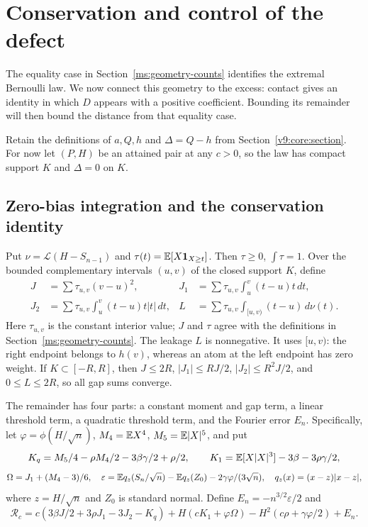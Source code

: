 \section{Conservation and control of the defect}\label{revision:conservation}
The equality case in Section~\ref{ms:geometry-counts} identifies the
extremal Bernoulli law. We now connect this geometry to the excess:
contact gives an identity in which $D$ appears with a positive
coefficient. Bounding its remainder will then bound the distance from
that equality case.

Retain the definitions of $a,Q,h$ and $\Delta=Q-h$ from
Section~\ref{v9:core:section}. For now let $(P,H)$ be an attained pair
at any $c>0$, so the law has compact support $K$ and $\Delta=0$ on $K$.

\subsection{Zero-bias integration and the conservation identity}

Put $\nu=\mathcal L(H-S_{n-1})$ and
$\tau(t)=\mathbb E[X\mathbf1_{X\ge t}]$. Then $\tau\ge0$, $\int\tau=1$.
Over the bounded complementary intervals $(u,v)$ of the closed support
$K$, define
\begin{align*}
 J&=\sum\tau_{u,v}(v-u)^2,&
 J_1&=\sum\tau_{u,v}\int_u^v(t-u)t\,dt,\\
 J_2&=\sum\tau_{u,v}\int_u^v(t-u)t|t|\,dt,&
 L&=\sum\tau_{u,v}\int_{[u,v)}(t-u)\,d\nu(t).
\end{align*}
Here $\tau_{u,v}$ is the constant interior value; $J$ and $\tau$ agree
with the definitions in Section~\ref{ms:geometry-counts}. The leakage
$L$ is nonnegative. It uses $[u,v)$: the right endpoint belongs to
$h(v)$, whereas an atom at the left endpoint has zero weight. If
$K\subset[-R,R]$, then $J\le2R$, $|J_1|\le RJ/2$,
$|J_2|\le R^2J/2$, and $0\le L\le2R$, so all gap sums converge.

The remainder has four parts: a constant moment and gap term, a linear
threshold term, a quadratic threshold term, and the Fourier error $E_n$.
Specifically, let $\varphi=\phi(H/\sqrt n)$,
$M_4=\mathbb E X^4$, $M_5=\mathbb E|X|^5$, and put
\[
 K_q=M_5/4-\rho M_4/2-3\beta\gamma/2+\rho/2,
 \qquad K_1=\mathbb E[X|X|^3]-3\beta-3\rho\gamma/2,
\]
\[
 \Omega=J_1+(M_4-3)/6,\quad
 \varepsilon=\mathbb E q_z(S_n/\sqrt n)-\mathbb E q_z(Z_0)
                  -2\gamma\varphi/(3\sqrt n),\quad
 q_z(x)=(x-z)|x-z|,
\]
where $z=H/\sqrt n$ and $Z_0$ is standard normal. Define $E_n=-n^{3/2}\varepsilon/2$ and
\begin{equation}\label{v9:core:R}
 \mathcal R_c=c(3\beta J/2+3\rho J_1-3J_2-K_q)
 +H(cK_1+\varphi\Omega)-H^2(c\rho+\gamma\varphi/2)+E_n.
\end{equation}


